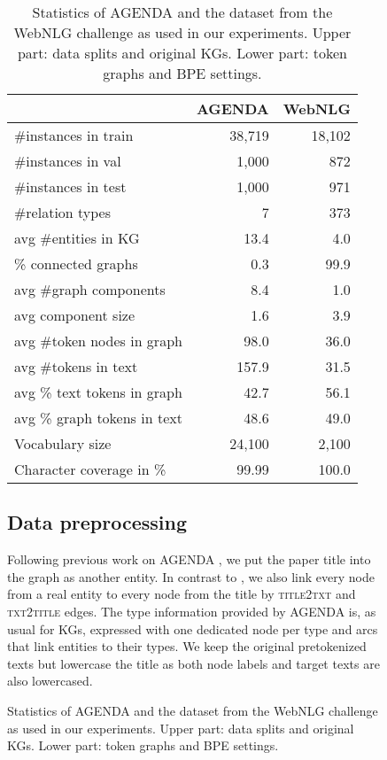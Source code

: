 \documentclass[11pt]{article}
\begin{document}
\begin{figure}
\begin{tabular}
\begin{table}[t!]
	\centering
	\small
	\begin{tabular}{lrr}
		\toprule
		& {AGENDA} & {WebNLG} \\
		\midrule
		\#{}instances in train  & 38,719 & 18,102 \\
		\#{}instances in val & 1,000 & 872 \\
		\#{}instances in test & 1,000 & 971 \\
		\midrule
		\#{}relation types & 7 & 373 \\
		avg \#{}entities in KG & 13.4 & 4.0 \\
		\%{} connected graphs & 0.3 & 99.9 \\
		avg \#{}graph components & 8.4 & 1.0 \\
		avg component size & 1.6 & 3.9 \\
\midrule
		avg \#{}token nodes in graph & 98.0 & 36.0 \\
		avg \#{}tokens in text & 157.9 & 31.5 \\
		avg \%{} text tokens in graph & 42.7 & 56.1 \\
		avg \%{} graph tokens in text  & 48.6 & 49.0 \\
		\midrule
		Vocabulary size  & 24,100 & 2,100 \\
		Character coverage in \%{} & 99.99 & 100.0 \\ 
		\bottomrule
	\end{tabular}
	\caption{Statistics of AGENDA and the dataset from the WebNLG challenge as used in our experiments.
		Upper part: data splits and original KGs. Lower part: token graphs and BPE settings.}
	\label{tab:datastats}
\end{table}

\subsection{Data preprocessing}
\label{sec:preprocessing}

Following previous work on AGENDA \citep{ribeiro20},
we put the paper title into the graph as another entity.
In contrast to \citet{ribeiro20},
we also link every node from a real entity
to every node from the title by \textsc{title2txt} and \textsc{txt2title} edges.
The type information provided by {AGENDA} is,
as usual for KGs,
expressed with one dedicated node per type
and \hasType{} arcs that link entities to their types.
We keep the original pretokenized texts but lowercase the title
as both node labels and target texts are
also lowercased.


\end{tabular}
\end{figure}
\end{document}

